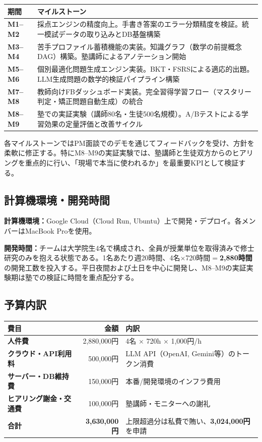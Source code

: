 \documentclass[paper=a4,fontsize=10.5bp,jafontsize=10.5bp]{jlreq}
\begin{document}
\begin{footnotesize}\noindent
\begin{tabularx}{\linewidth}{>{\bfseries}l X}
\toprule
期間 & マイルストーン \\
\midrule
M1--M2 & 採点エンジンの精度向上。手書き答案のエラー分類精度を検証。統一模試データの取り込みとDB基盤構築 \\
M3--M4 & 苦手プロファイル蓄積機能の実装。知識グラフ（数学の前提概念DAG）構築。塾講師によるアノテーション開始 \\
M5--M6 & 個別最適化問題生成エンジン実装。BKT・FSRSによる適応的出題。LLM生成問題の数学的検証パイプライン構築 \\
M7--M8 & 教師向けFBダッシュボード実装。完全習得学習フロー（マスタリー判定・矯正問題自動生成）の統合 \\
M8--M9 & 塾での実証実験（講師80名・生徒500名規模）。A/Bテストによる学習効果の定量評価と改善サイクル \\
\bottomrule
\end{tabularx}
\end{footnotesize}


\noindent
各マイルストーンではPM面談でのデモを通じてフィードバックを受け、方針を柔軟に修正する。特にM8--M9の実証実験では、塾講師と生徒双方からのヒアリングを重点的に行い、「現場で本当に使われるか」を最重要KPIとして検証する。

\subsection{計算機環境・開発時間}

\noindent\textbf{計算機環境：}Google Cloud（Cloud Run, Ubuntu）上で開発・デプロイ。各メンバーはMacBook Proを使用。

\noindent\textbf{開発時間：}チームは大学院生4名で構成され、全員が授業単位を取得済みで修士研究のみを抱える状態である。1名あたり週20時間、4名$\times$720時間$=$\textbf{2,880時間}の開発工数を投入する。平日夜間および土日を中心に開発し、M8--M9の実証実験期は塾での検証に時間を重点配分する。

\subsection{予算内訳}


\begin{footnotesize}\noindent
\begin{tabularx}{\linewidth}{>{\bfseries}l r X}
\toprule
費目 & 金額 & 内訳 \\
\midrule
人件費 & 2,880,000円 & 4名 $\times$ 720h $\times$ 1,000円/h \\
クラウド・API利用料 & 500,000円 & LLM API（OpenAI, Gemini等）のトークン消費 \\
サーバー・DB維持費 & 150,000円 & 本番/開発環境のインフラ費用 \\
ヒアリング謝金・交通費 & 100,000円 & 塾講師・モニターへの謝礼 \\
\midrule
\textbf{合計} & \textbf{3,630,000円} & 上限超過分は私費で賄い、\textbf{3,024,000円}を申請 \\
\bottomrule
\end{tabularx}
\end{footnotesize}
\end{document}

